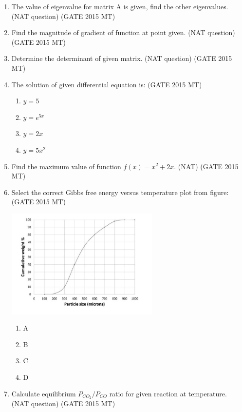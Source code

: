 \documentclass[12pt]{article}
\begin{document}
\begin{enumerate}
\item The value of eigenvalue for matrix A is given, find the other eigenvalues. (NAT question) (GATE 2015 MT)

\item Find the magnitude of gradient of function at point given. (NAT question) (GATE 2015 MT)

\item Determine the determinant of given matrix. (NAT question) (GATE 2015 MT)

\item The solution of given differential equation is: (GATE 2015 MT)
\begin{enumerate}[label=(\alph*)]
  \item $y = 5$
  \item $y = e^{5x}$
  \item $y = 2x$
  \item $y = 5x^2$
\end{enumerate}

\item Find the maximum value of function $f(x) = x^2 + 2x$. (NAT) (GATE 2015 MT)

\item Select the correct Gibbs free energy versus temperature plot from figure: (GATE 2015 MT)
\begin{center}
  \includegraphics[width=0.6\textwidth]{images/q46i.jpg}
\end{center}
\begin{enumerate}[label=(\alph*)]
  \item A
  \item B
  \item C
  \item D
\end{enumerate}

\item Calculate equilibrium $P_{CO_2}/P_{CO}$ ratio for given reaction at temperature. (NAT question) (GATE 2015 MT)


\end{enumerate}
\end{document}
